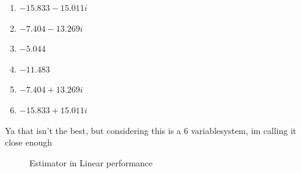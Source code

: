 \begin{enumerate}
  \item $-15.833 - 15.011 i$
  \item $-7.404 - 13.269 i$
  \item $-5.044$
  \item $-11.483$
  \item $-7.404 + 13.269 i$
  \item $-15.833 + 15.011 i$
\end{enumerate}
Ya that isn't the best, but considering this is a 6 variablesystem, im calling it close enough
\begin{figure}[H]
  \begin{center}
  \end{center}
  \caption{Estimator in Linear performance}
  \label{fig:estimator-linear}
\end{figure}


